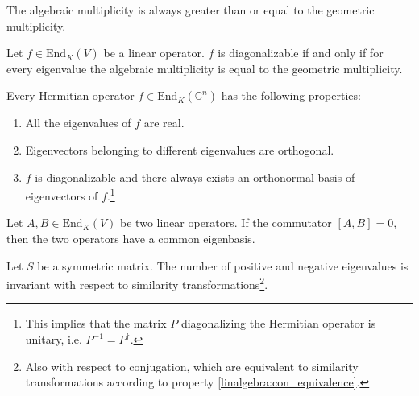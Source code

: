         \begin{property}
        The algebraic multiplicity is always greater than or equal to the geometric multiplicity.
    \end{property}
        \begin{theorem}\label{linalgebra:theorem:diagonalizable_multiplicity}
            Let $f\in\text{End}_K(V)$ be a linear operator. $f$ is diagonalizable if and only if for every eigenvalue the algebraic multiplicity is equal to the geometric multiplicity.
    \end{theorem}

    \begin{property}\label{linalgebra:diagonalizable_hermitian}
        Every Hermitian operator $f\in\text{End}_K(\mathbb{C}^n)$ has the following properties:
            \begin{enumerate}
            \item All the eigenvalues of $f$ are real.
                    \item Eigenvectors belonging to different eigenvalues are orthogonal.
                    \item $f$ is diagonalizable and there always exists an orthonormal basis of eigenvectors of $f$.\footnote{This implies that the matrix $P$ diagonalizing the Hermitian operator is unitary, i.e. $P^{-1} = P^\dag$.}
        \end{enumerate}
    \end{property}

        \begin{property}
        Let $A, B \in \text{End}_K(V)$ be two linear operators. If the commutator $[A, B] = 0$, then the two operators have a common eigenbasis.
    \end{property}

        \begin{theorem}
            Let $S$ be a symmetric matrix. The number of positive and negative eigenvalues is invariant with respect to similarity transformations\footnote{Also with respect to conjugation, which are equivalent to similarity transformations according to property \ref{linalgebra:con_equivalence}.}.
        \end{theorem}
